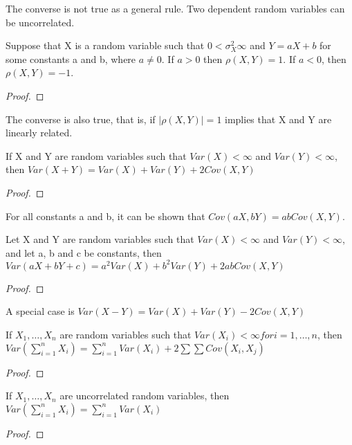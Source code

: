 The converse is not true as a general rule. Two dependent random variables can be uncorrelated.

\begin{proposition}
Suppose that X is a random variable such that $0<\sigma_{X}^{2}\infty$ and $Y=aX+b$ for some constants a and b, where $a\neq0$. If $a>0$ then $\rho\left(X,Y\right)=1$. If $a<0$, then $\rho\left(X,Y\right)=-1$.
\end{proposition}
\begin{proof}
\end{proof}

The converse is also true, that is, if $\left|\rho\left(X,Y\right)\right|=1$ implies that X and Y are linearly related.

\begin{proposition}
If X and Y are random variables such that $Var\left(X\right)<\infty$ and $Var\left(Y\right)<\infty$, then $Var\left(X+Y\right)=Var\left(X\right)+Var\left(Y\right)+2Cov\left(X,Y\right)$
\end{proposition}
\begin{proof}
\end{proof}

For all constants a and b, it can be shown that $Cov\left(aX,bY\right)=abCov\left(X,Y\right)$.

\begin{proposition}
Let X and Y are random variables such that $Var\left(X\right)<\infty$ and $Var\left(Y\right)<\infty$, and let a, b and c be constants, then $Var\left(aX+bY+c\right)=a^{2}Var\left(X\right)+b^{2}Var\left(Y\right)+2abCov\left(X,Y\right)$
\end{proposition}
\begin{proof}
\end{proof}

A special case is $Var\left(X-Y\right)=Var\left(X\right)+Var\left(Y\right)-2Cov\left(X,Y\right)$

\begin{proposition}
If $X_{1},\ldots,X_{n}$ are random variables such that $Var\left(X_{i}\right)<\infty for i=1,\ldots,n$, then $Var\left(\sum_{i=1}^{n}X_{i}\right)=\sum_{i=1}^{n}Var\left(X_{i}\right)+2\sum\sum Cov\left(X_{i},X_{j}\right)$
\end{proposition}
\begin{proof}
\end{proof}

\begin{proposition}
If $X_{1},\ldots,X_{n}$ are uncorrelated random variables, then $Var\left(\sum_{i=1}^{n}X_{i}\right)=\sum_{i=1}^{n}Var\left(X_{i}\right)$
\end{proposition}
\begin{proof}
\end{proof}


